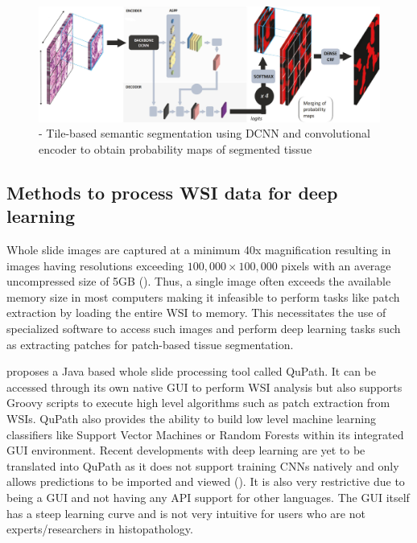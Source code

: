 \documentclass{l4proj}
\begin{document}
\begin{figure}[h]
    \centering
    \includegraphics[scale=0.4]{images/Priego-DCNN-encoder-arch.png}
    \caption{\cite{priego2020automatic} - Tile-based semantic segmentation using DCNN and convolutional encoder to obtain probability maps of segmented tissue}
    \label{fig:Priego-conv-pipeline}
\end{figure}

\subsection{Methods to process WSI data for deep learning}
Whole slide images are captured at a minimum 40x magnification resulting in images having resolutions exceeding \(100,000 \times 100,000\) pixels with an average uncompressed size of 5GB (\cite{bandi2018detection}). Thus, a single image often exceeds the available memory size in most computers making it infeasible to perform tasks like patch extraction by loading the entire WSI to memory. This necessitates the use of specialized software to access such images and perform deep learning tasks such as extracting patches for patch-based tissue segmentation.

\cite{bankhead2017qupath} proposes a Java based whole slide processing tool called QuPath. It can be accessed through its own native GUI to perform WSI analysis but also supports Groovy scripts to execute high level algorithms such as patch extraction from WSIs. QuPath also provides the ability to build low level machine learning classifiers like Support Vector Machines or Random Forests within its integrated GUI environment. Recent developments with deep learning are yet to be translated into QuPath as it does not support  training CNNs natively and only allows predictions to be imported and viewed (\cite{pedersen2021fastpathology}). It is also very restrictive due to being a GUI and not having any API support for other languages. The GUI itself has a steep learning curve and is not very intuitive for users who are not experts/researchers in histopathology. 
\end{document}
